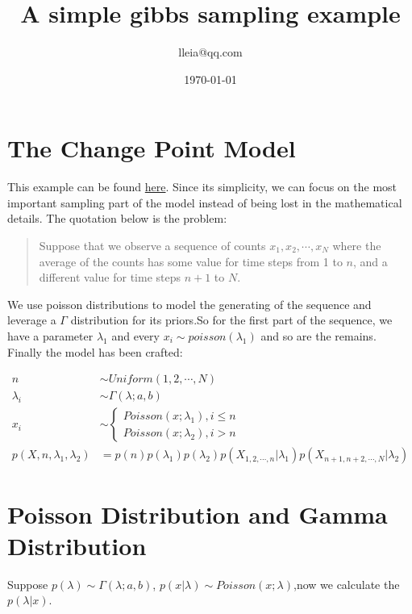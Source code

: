 \documentclass[12pt]{article}
\begin{document}
\title{\textsf{A simple gibbs sampling example}}
\author{\textsf{lleia@qq.com}}
\date{\today}
\maketitle

\section{The Change Point Model}
This example can be found \href{http://www.bcs.rochester.edu/people/robbie/jacobslab/cheat_sheet/GibbsSampling.pdf}{here}. Since its simplicity, we can focus on the most important sampling part of the model instead of being lost in the mathematical details. The quotation below is the problem:

\begin{quotation}
Suppose that we observe a sequence of counts $x_1,x_2,\cdots,x_N$ where the average of the counts has some value for time steps from 1 to $n$, and a different value for time steps $n+1$ to $N$.
\end{quotation} 

We use poisson distributions to model the generating of the sequence and leverage a $\Gamma$ distribution for its priors.So for the first part of the sequence, we have a parameter $\lambda_1$ and every $x_i \sim poisson(\lambda_1)$ and so are the remains. Finally the model has been crafted:   

\begin{align}
	n & \sim   Uniform(1,2,\cdots,N) \\
	\lambda_i & \sim  \Gamma(\lambda;a,b) \\
	x_i & \sim  \begin{cases} Poisson(x;\lambda_1),i \le n\\ Poisson(x;\lambda_2), i > n \end{cases} \\
	p(X,n,\lambda_1,\lambda_2) &= p(n)p(\lambda_1)p(\lambda_2)p(X_{1,2,\cdots,n}|\lambda_1)p(X_{n+1,n+2,\cdots,N}|\lambda_2)
\end{align}

\section{Poisson Distribution and Gamma Distribution}\label{section:conjugate}
Suppose $p(\lambda) \sim \Gamma(\lambda;a,b)$, $p(x|\lambda) \sim Poisson(x;\lambda)$,now we calculate the $p(\lambda|x)$.
\end{document}
